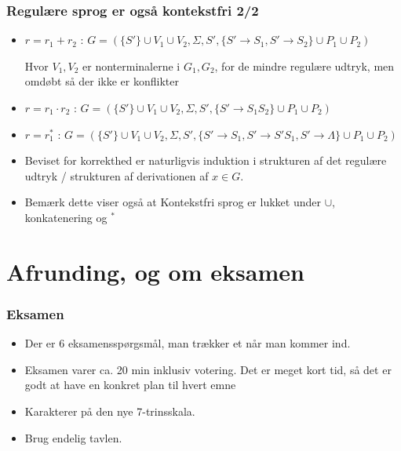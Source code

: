 \documentclass[handout]{beamer}
\begin{document}
\begin{frame}
\frametitle{Regulære sprog er også kontekstfri 2/2}
\begin{itemize}[<+->]
\item $r = r_1+r_2$ : $G=(\{S'\}\cup V_1 \cup V_2, \Sigma, S', \{S'\rightarrow S_1, S'\rightarrow S_2\} \cup P_1 \cup P_2)$

  Hvor $V_1, V_2$ er nonterminalerne i $G_1, G_2$, for de mindre regulære udtryk, men \alert{omdøbt så der ikke er konflikter}
\item $r = r_1\cdot r_2$ : $G=(\{S'\}\cup V_1 \cup V_2,\Sigma, S', \{S'\rightarrow S_1S_2\} \cup P_1 \cup P_2)$
\item $r = r_1^*$ : $G=(\{S'\}\cup V_1 \cup V_2,\Sigma, S', \{S'\rightarrow S_1, S'\rightarrow S'S_1, S' \rightarrow \Lambda\} \cup P_1 \cup P_2)$
\item Beviset for korrekthed er naturligvis induktion i strukturen af det regulære udtryk / strukturen af derivationen af $x\in G$.
\item Bemærk dette viser også at Kontekstfri sprog er lukket under $\cup$, konkatenering og ${}^*$

\end{itemize}
\end{frame}
\section{Afrunding, og om eksamen}
\begin{frame}
\frametitle{Eksamen}
\begin{itemize}
\item Der er 6 eksamensspørgsmål, man trækker et når man kommer ind.
\item Eksamen varer ca. 20 min inklusiv votering. Det er meget kort
  tid, så det er godt at have en konkret plan til hvert emne
\item Karakterer på den nye 7-trinsskala.
\item Brug endelig tavlen.
\end{itemize}
\end{frame}
\end{document}
